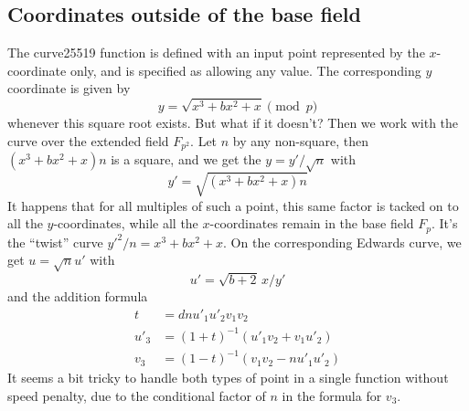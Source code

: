 \documentclass[a4paper]{article}
\begin{document}
\subsection{Coordinates outside of the base field}

The curve25519 function is defined with an input point represented by
the $x$-coordinate only, and is specified as allowing any value. The
corresponding $y$ coordinate is given by
\begin{equation*}
  y = \sqrt{x^3 + b x^2 + x} \pmod p
\end{equation*}
whenever this square root exists. But what if it doesn't? Then we work
with the curve over the extended field $F_{p^2}$. Let $n$ by any
non-square, then $(x^3 + b x^2 + x) n$ is a square, and we get the
$y = y' / \sqrt{n}$ with
\begin{equation*}
  y' = \sqrt{(x^3 + b x^2 + x) n}
\end{equation*}
It happens that for all multiples of such a point, this same factor is
tacked on to all the $y$-coordinates, while all the $x$-coordinates
remain in the base field $F_p$. It's the ``twist'' curve $y'^2 / n =
x^3 + bx^2 + x$. On the corresponding Edwards curve, we
get $u = \sqrt{n} u'$ with
\begin{equation*}
  u' = \sqrt{b+2} \, x / y'
\end{equation*}
and the addition formula
\begin{align*}
  t &= d n u'_1 u'_2 v_1 v_2 \\
  u'_3 &= (1+t)^{-1}(u'_1v_2 + v_1 u'_2) \\
  v_3 &= (1-t)^{-1}(v_1 v_2 - n u'_1 u'_2)
\end{align*}
It seems a bit tricky to handle both types of point in a single
function without speed penalty, due to the conditional factor of $n$
in the formula for $v_3$.
\end{document}

